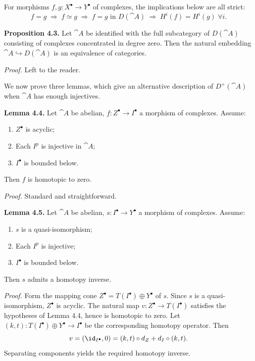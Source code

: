 \setcounter{page}{40}
For morphisms \(f,g\colon X^\bullet\to Y^\bullet\) of complexes, the implications below are all strict:
\[
f=g \;\Longrightarrow\; f\simeq g \;\Longrightarrow\; f=g \text{ in }D(\cat{A}) \;\Longrightarrow\; H^i(f)=H^i(g)\;\forall i.
\]

\medskip
\textbf{Proposition 4.3.}
Let \(\cat{A}\) be identified with the full subcategory of \(D(\cat{A})\) consisting of complexes concentrated in degree zero. Then the natural embedding \(\cat{A}\hookrightarrow D(\cat{A})\) is an equivalence of categories.

\textit{Proof.} Left to the reader.

We now prove three lemmas, which give an alternative description of \(D^+(\cat{A})\) when \(\cat{A}\) has enough injectives.

\medskip
\textbf{Lemma 4.4.}
Let \(\cat{A}\) be abelian, \(f\colon Z^\bullet\to I^\bullet\) a morphism of complexes. Assume:
\begin{enumerate}
\item[(1)] \(Z^\bullet\) is acyclic;
\item[(2)] Each \(I^p\) is injective in \(\cat{A}\);
\item[(3)] \(I^\bullet\) is bounded below.
\end{enumerate}
Then \(f\) is homotopic to zero.

\textit{Proof.} Standard and straightforward.

\setcounter{page}{41}
\medskip
\textbf{Lemma 4.5.}
Let \(\cat{A}\) be abelian, \(s\colon I^\bullet\to Y^\bullet\) a morphism of complexes. Assume:
\begin{enumerate}
\item[(1)] \(s\) is a quasi-isomorphism;
\item[(2)] Each \(I^p\) is injective;
\item[(3)] \(I^\bullet\) is bounded below.
\end{enumerate}
Then \(s\) admits a homotopy inverse.

\textit{Proof.} Form the mapping cone \(Z^\bullet = T(I^\bullet)\oplus Y^\bullet\) of \(s\). Since \(s\) is a quasi-isomorphism, \(Z^\bullet\) is acyclic. The natural map \(v\colon Z^\bullet\to T(I^\bullet)\) satisfies the hypotheses of Lemma 4.4, hence is homotopic to zero. Let \((k,t)\colon T(I^\bullet)\oplus Y^\bullet\to I^\bullet\) be the corresponding homotopy operator. Then
\[
v = (\id_{I^\bullet},0) = (k,t)\circ d_Z + d_I\circ(k,t).
\]
Separating components yields the required homotopy inverse.